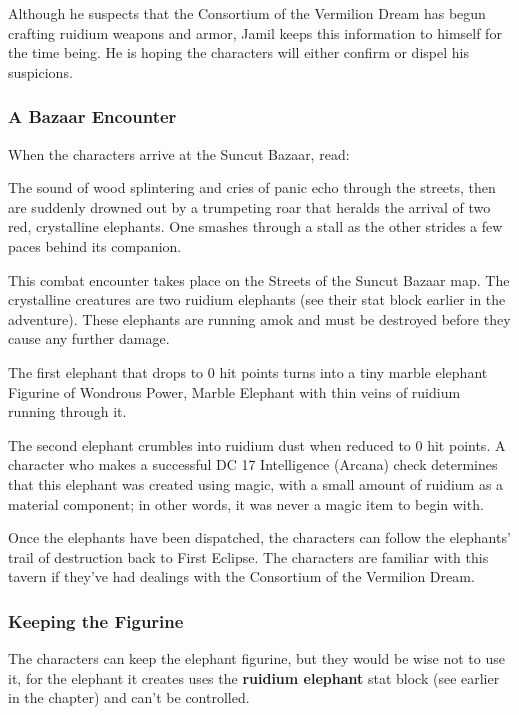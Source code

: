\documentclass[10pt,a4paper,twoside,fancy,bg=print,twocolumn,openany,nodeprecatedcode]{dndbook}
\begin{document}
Although he suspects that the Consortium of the Vermilion Dream has begun crafting ruidium weapons and armor, Jamil keeps this information to himself for the time being. He is hoping the characters will either confirm or dispel his suspicions.

\subsubsection{A Bazaar Encounter}
When the characters arrive at the Suncut Bazaar, read:

\begin{DndReadAloud}{}
The sound of wood splintering and cries of panic echo through the streets, then are suddenly drowned out by a trumpeting roar that heralds the arrival of two red, crystalline elephants. One smashes through a stall as the other strides a few paces behind its companion.

\end{DndReadAloud}

This combat encounter takes place on the Streets of the Suncut Bazaar map. The crystalline creatures are two ruidium elephants (see their stat block earlier in the adventure). These elephants are running amok and must be destroyed before they cause any further damage.

The first elephant that drops to 0 hit points turns into a tiny marble elephant Figurine of Wondrous Power, Marble Elephant with thin veins of ruidium running through it.

The second elephant crumbles into ruidium dust when reduced to 0 hit points. A character who makes a successful DC 17 Intelligence (Arcana) check determines that this elephant was created using magic, with a small amount of ruidium as a material component; in other words, it was never a magic item to begin with.

Once the elephants have been dispatched, the characters can follow the elephants' trail of destruction back to First Eclipse. The characters are familiar with this tavern if they've had dealings with the Consortium of the Vermilion Dream.

\subsubsection{Keeping the Figurine}
The characters can keep the elephant figurine, but they would be wise not to use it, for the elephant it creates uses the \textbf{ruidium elephant} stat block (see earlier in the chapter) and can't be controlled.
\end{document}
